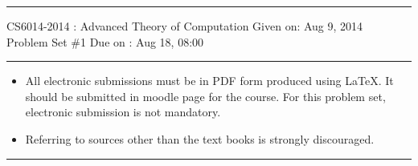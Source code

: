 \documentclass[solution,addpoints,12pt]{exam}
\begin{document}
\hrule
\vspace{3mm}
\noindent 
{\sf CS6014-2014 : Advanced Theory of Computation  \hfill Given on: Aug 9, 2014}
\vspace{3mm}\\
\noindent 
{\sf Problem Set \#1 \hfill Due on : Aug 18, 08:00}
\vspace{3mm}
\hrule
{\small
\begin{itemize}
\item All electronic submissions must be in PDF form produced using \LaTeX. It should be submitted in moodle page for the course. For this problem set, electronic submission is not mandatory.
\item Referring to sources other than the text books is strongly
  discouraged. 
\end{itemize}}
\hrule
\end{document}
